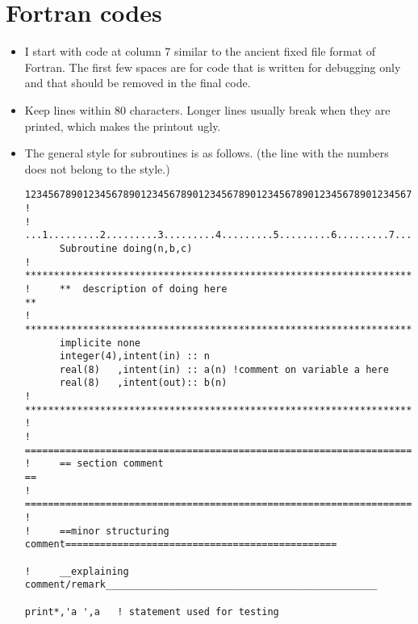 \documentclass[11pt,a4paper]{report}
\begin{document}
\section{Fortran codes}
\begin{itemize}
\item I start with code at column 7 similar to the ancient fixed file
  format of Fortran. The first few spaces are for code that is written
  for debugging only and that should be removed in the final code.
%
\item Keep lines within 80 characters. Longer lines usually break when
  they are printed, which makes the printout ugly.
%
\item The general style for subroutines is as follows. (the line with
  the numbers does not belong to the style.)
\begin{verbatim}
12345678901234567890123456789012345678901234567890123456789012345678901234567890
!
!     ...1.........2.........3.........4.........5.........6.........7.........8
      Subroutine doing(n,b,c)
!     **************************************************************************
!     **  description of doing here                                           **
!     **************************************************************************
      implicite none
      integer(4),intent(in) :: n
      real(8)   ,intent(in) :: a(n) !comment on variable a here
      real(8)   ,intent(out):: b(n)
!     **************************************************************************
!
!     ==========================================================================
!     == section comment                                                      ==
!     ==========================================================================
!
!     ==minor structuring comment===============================================

!     __explaining comment/remark_______________________________________________

print*,'a ',a   ! statement used for testing 


\end{verbatim}
\end{itemize}
\end{document}
